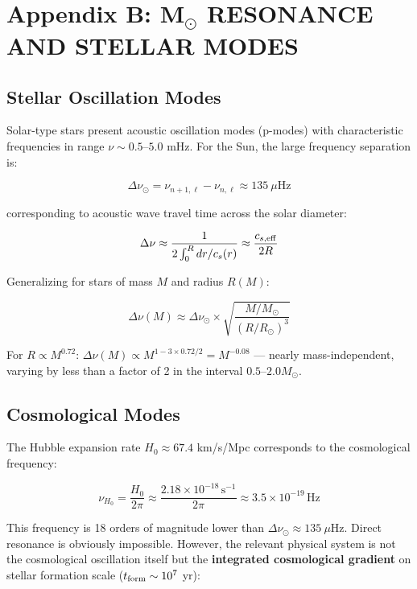 \documentclass[11pt,a4paper]{article}
\begin{document}
\hypertarget{appendix-b-m-resonance-and-stellar-modes}{%
\section*{Appendix B: M$_{\odot}$ RESONANCE AND STELLAR
MODES}\label{appendix-b-m-resonance-and-stellar-modes}}

\hypertarget{b.1-stellar-oscillation-modes}{%
\subsection*{Stellar Oscillation
Modes}\label{b.1-stellar-oscillation-modes}}

Solar-type stars present acoustic oscillation modes (p-modes) with
characteristic frequencies in range \(\nu \sim 0.5\)--\(5.0\) mHz. For
the Sun, the large frequency separation is:

\[\Delta\nu_\odot = \nu_{n+1,\ell} - \nu_{n,\ell} \approx 135~\mu\mathrm{Hz}\]

corresponding to acoustic wave travel time across the solar diameter:

\[\Delta\nu \approx \frac{1}{2\int_0^R dr/c_s(r)} \approx \frac{c_{s,\rm eff}}{2R}\]

Generalizing for stars of mass \(M\) and radius \(R(M)\):

\[\Delta\nu(M) \approx \Delta\nu_\odot \times \sqrt{\frac{M/M_\odot}{(R/R_\odot)^3}}\]

For \(R \propto M^{0.72}\):
\(\Delta\nu(M) \propto M^{1 - 3\times0.72/2} = M^{-0.08}\) --- nearly
mass-independent, varying by less than a factor of 2 in the interval
\(0.5\)--\(2.0 M_\odot\).

\hypertarget{b.2-cosmological-modes}{%
\subsection*{Cosmological Modes}\label{b.2-cosmological-modes}}

The Hubble expansion rate \(H_0 \approx 67.4\) km/s/Mpc corresponds to
the cosmological frequency:

\[\nu_{H_0} = \frac{H_0}{2\pi} \approx \frac{2.18\times10^{-18}\,\mathrm{s}^{-1}}{2\pi} \approx 3.5\times10^{-19}\,\mathrm{Hz}\]

This frequency is 18 orders of magnitude lower than
\(\Delta\nu_\odot \approx 135~\mu\mathrm{Hz}\). Direct resonance is
obviously impossible. However, the relevant physical system is not the
cosmological oscillation itself but the \textbf{integrated cosmological
gradient} on stellar formation scale (\(t_{\rm form} \sim 10^7\) yr):
\end{document}
